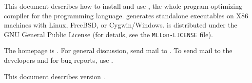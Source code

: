 This document describes how to install and use {\mlton}, the
whole-program optimizing compiler for the
programming language.
{\mlton} generates standalone executables on X86 machines with
Linux, FreeBSD, or Cygwin/Windows. 
{\mlton} is distributed under the GNU General Public License (for details, see
the {\tt MLton-LICENSE} file).

The {\mlton} homepage is \absolutelink{}.  For general {\mlton}
discussion, send mail to {\mltonUserMail}.  To send mail to the
{\mlton} developers and for bug reports, use {\mltonmail}.

This document describes {\mlton} version {\version}.

